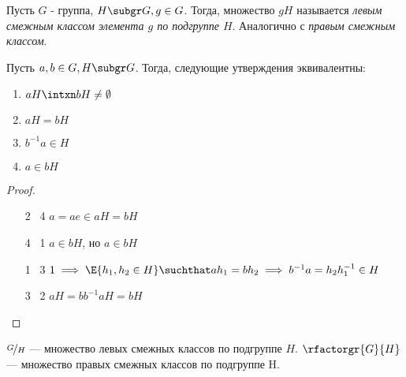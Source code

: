 \begin{definition}
  Пусть $G$ - группа, $H \subgr G, g \in G$. Тогда, множество $gH$ называется \emph{левым смежным классом элемента $g$ по подгруппе $H$}. Аналогично с \emph{правым смежным классом}.
\end{definition}

\begin{theorem}\label{th:comclasses}
  Пусть $a, b \in G, H \subgr G$. Тогда, следующие утверждения эквивалентны:
  \begin{enumerate}
    \item $aH \intxn bH \neq \emptyset$
    \item $aH=bH$
    \item $b^{-1} a \in H$
    \item $a \in bH$
  \end{enumerate}
\end{theorem}
\begin{proof}
  \theoremlistshack
  \begin{enumerate}[leftmargin=10ex]
    \item [2 \rightarrow\ 4] $a=ae \in aH = bH$
    \item [4 \rightarrow\ 1] $a \in bH$, но $a \in bH$
    \item [1 \rightarrow\ 3] $1 \implies \E{h_1, h_2\in H}\suchthat ah_1=bh_2\implies b^{-1} a=h_2h_1^{-1}\in H$
    \item [3 \rightarrow\ 2] $aH=bb^{-1} aH=bH$
  \end{enumerate}
\end{proof}

\begin{denotation}
  $\factorgr{G}{H}$ --- множество левых смежных классов по подгруппе $H$. $\rfactorgr{G}{H}$ --- множество правых смежных классов по подгруппе H.
\end{denotation}

